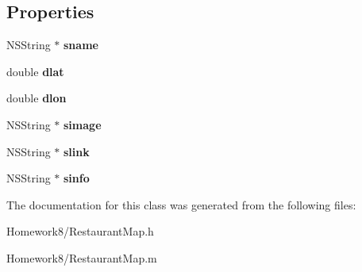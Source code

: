 \subsection*{Properties}
\begin{DoxyCompactItemize}
\item 
\mbox{\label{interface_restaurant_map_ae4fafff89e6b2244aac270b7c7551b77}} 
N\+S\+String $\ast$ {\bfseries sname}
\item 
\mbox{\label{interface_restaurant_map_a600869b5a5556d9e4f3d734271dc09ed}} 
double {\bfseries dlat}
\item 
\mbox{\label{interface_restaurant_map_acf5fcb7055f9266af08d0586464916ca}} 
double {\bfseries dlon}
\item 
\mbox{\label{interface_restaurant_map_a7e18d9bd9127d6d190b19e458b65f579}} 
N\+S\+String $\ast$ {\bfseries simage}
\item 
\mbox{\label{interface_restaurant_map_ab4730030e43bb99f5c54492e55d73630}} 
N\+S\+String $\ast$ {\bfseries slink}
\item 
\mbox{\label{interface_restaurant_map_a5540509713cccf07a4a4a865fd044cfd}} 
N\+S\+String $\ast$ {\bfseries sinfo}
\end{DoxyCompactItemize}


The documentation for this class was generated from the following files\+:\begin{DoxyCompactItemize}
\item 
Homework8/Restaurant\+Map.\+h\item 
Homework8/Restaurant\+Map.\+m\end{DoxyCompactItemize}
